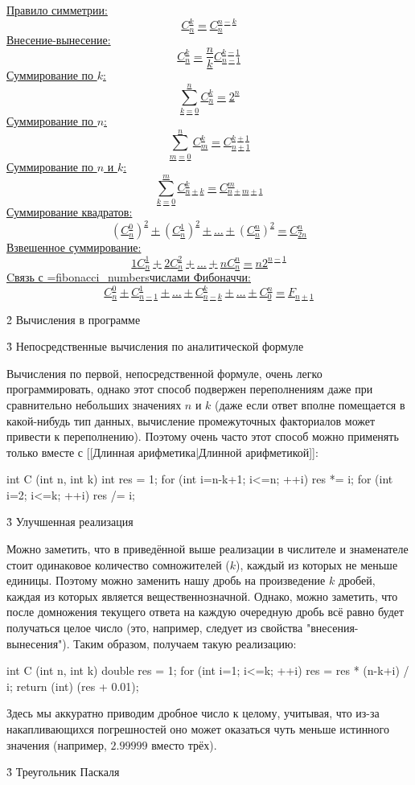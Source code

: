 \ul{
\li Правило симметрии:
$$ C_n^k = C_n^{n-k} $$
\li Внесение-вынесение:
$$ C_n^k = \frac{n}{k} C_{n-1}^{k-1} $$
\li Суммирование по $k$:
$$ \sum_{k=0}^n C_n^k = 2^n $$
\li Суммирование по $n$:
$$ \sum_{m=0}^n C_m^k = C_{n+1}^{k+1} $$
\li Суммирование по $n$ и $k$:
$$ \sum_{k=0}^{m} C_{n+k}^k = C_{n+m+1}^m $$
\li Суммирование квадратов:
$$ (C_n^0)^2 + (C_n^1)^2 + \ldots + (C_n^n)^2 = C_{2n}^n $$
\li Взвешенное суммирование:
$$ 1 C_n^1 + 2 C_n^2 + \ldots + n C_n^n = n 2^{n-1} $$
\li Cвязь с \algohref=fibonacci_numbers{числами Фибоначчи}:
$$ C_n^0 + C_{n-1}^1 + \ldots + C_{n-k}^k + \ldots + C_0^n = F_{n+1} $$
}


\h2{ Вычисления в программе }

\h3{ Непосредственные вычисления по аналитической формуле }

Вычисления по первой, непосредственной формуле, очень легко программировать, однако этот способ подвержен переполнениям даже при сравнительно небольших значениях $n$ и $k$ (даже если ответ вполне помещается в какой-нибудь тип данных, вычисление промежуточных факториалов может привести к переполнению). Поэтому очень часто этот способ можно применять только вместе с [[Длинная арифметика|Длинной арифметикой]]:

\code

int C (int n, int k) {
	int res = 1;
	for (int i=n-k+1; i<=n; ++i)
		res *= i;
	for (int i=2; i<=k; ++i)
		res /= i;
}
\endcode

\h3{ Улучшенная реализация }

Можно заметить, что в приведённой выше реализации в числителе и знаменателе стоит одинаковое количество сомножителей ($k$), каждый из которых не меньше единицы. Поэтому можно заменить нашу дробь на произведение $k$ дробей, каждая из которых является вещественнозначной. Однако, можно заметить, что после домножения текущего ответа на каждую очередную дробь всё равно будет получаться целое число (это, например, следует из свойства "внесения-вынесения"). Таким образом, получаем такую реализацию:

\code

int C (int n, int k) {
	double res = 1;
	for (int i=1; i<=k; ++i)
		res = res * (n-k+i) / i;
	return (int) (res + 0.01);
}
\endcode

Здесь мы аккуратно приводим дробное число к целому, учитывая, что из-за накапливающихся погрешностей оно может оказаться чуть меньше истинного значения (например, $2.99999$ вместо трёх).

\h3{ Треугольник Паскаля }

